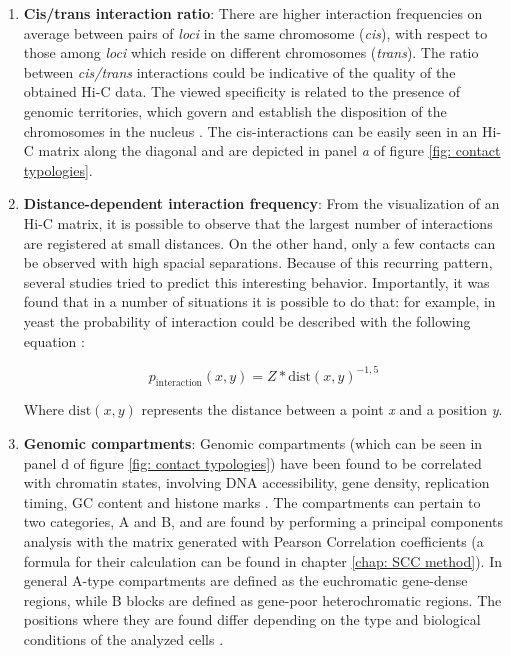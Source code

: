 \begin{enumerate}
    \item \textbf{Cis/trans interaction ratio}: There are higher interaction frequencies on average between pairs of \textit{loci} in the same chromosome (\textit{cis}), with respect to those among \textit{loci} which reside on different chromosomes (\textit{trans}). The ratio between \textit{cis/trans} interactions could be indicative of the quality of the obtained Hi-C data.
    The viewed specificity is related to the presence of genomic territories, which govern and establish the disposition of the chromosomes in the nucleus
    \cite{halversonMeltRingsChromosome2014}. The cis-interactions can be easily seen in an Hi-C matrix along the diagonal and are depicted in panel \textit{a} of figure \ref{fig: contact typologies}.
    
    \item \textbf{Distance-dependent interaction frequency}: From the visualization of an Hi-C matrix, it is possible to observe that the largest number of interactions are registered at small distances. On the other hand, only a few contacts can be observed with high spacial separations. Because of this recurring pattern, several studies tried to predict this interesting behavior. Importantly, it was found that in a number of situations it is possible to do that: for example, in yeast the probability of interaction could be described with the following equation
    \cite{lajoieHitchhikerGuideHiC2015}:
    
    $$
        p_{\text{interaction}}(x,y) = Z * \text{dist}(x,y)^{-1,5}
    $$

    Where $\text{dist}(x, y)$ represents the distance between a point \textit{x} and a position \textit{y}.
    
    \item \textbf{Genomic compartments}: Genomic compartments (which can be seen in panel d of figure \ref{fig: contact typologies}) have been found to be correlated with chromatin states, involving DNA accessibility, gene density, replication timing, GC content and histone marks
    \cite{lieberman-aidenComprehensiveMappingLong2009}. 
    The compartments can pertain to two categories, A and B, and are found by performing a principal components analysis with the matrix generated with Pearson Correlation coefficients (a formula for their calculation can be found in chapter \ref{chap: SCC method}). In general A-type compartments are defined as the euchromatic gene-dense regions, while B blocks are defined as gene-poor heterochromatic regions. 
    The positions where they are found differ depending on the type and biological conditions of the analyzed cells
    \cite{lajoieHitchhikerGuideHiC2015}.
    

\end{enumerate}
